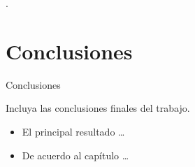 \setlength{\headheight}{14.49998pt}.
\pagestyle{fancy}

\chapter*{Conclusiones}
{Conclusiones}

Incluya las conclusiones finales del trabajo.

\begin{itemize}
  \item El principal resultado \dots
  \item De acuerdo al cap\'itulo \dots
\end{itemize}
